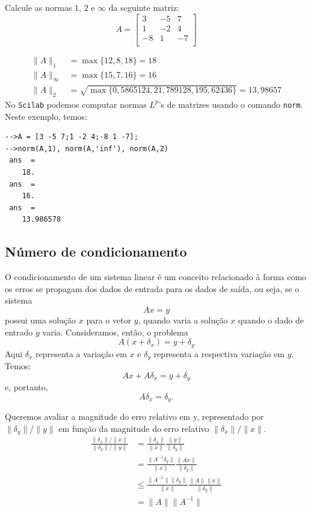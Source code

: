 \begin{ex}
Calcule as normas $1$, $2$ e $\infty$ da seguinte matriz:
\begin{equation*}
  A=\left[
\begin{array}{ccc}
3 & -5 & 7\\
1 & -2 & 4\\
-8 & 1 & -7\\
\end{array}
\right]
\end{equation*}
\end{ex}
\begin{sol}
  \begin{align*}
    \|A\|_1 &= \max\{12, 8, 18\}=18\\
    \|A\|_\infty &= \max\{15, 7, 16\}=16\\
    \|A\|_2 &= \sqrt{\max\{0,5865124, 21,789128, 195,62436\}}= 13,98657
  \end{align*}
\ifisscilab
No \verb+Scilab+ podemos computar normas $L^p$'s de matrizes usando o comando \verb+norm+. Neste exemplo, temos:
\begin{verbatim}
-->A = [3 -5 7;1 -2 4;-8 1 -7];
-->norm(A,1), norm(A,'inf'), norm(A,2)
 ans  =
    18.  
 ans  =
    16.  
 ans  =
    13.986578
\end{verbatim}
\fi
\end{sol}

\subsection{Número de condicionamento}

O condicionamento de um sistema linear é um conceito relacionado à forma como os erros se propagam dos dados de entrada para os dados de saída, ou seja, se o sistema $$Ax=y$$
possui uma solução $x$ para o vetor $y$, quando varia a solução $x$ quando o dado de entrado $y$ varia. Consideramos, então, o problema
$$A(x+\delta_x)=y+\delta_y$$
Aqui $\delta_x$ representa a variação em $x$ e $\delta_y$ representa a respectiva variação em $y$. Temos:
$$Ax+A\delta_x=y+\delta_y$$ e, portanto,
$$A\delta_x=\delta_y.$$

Queremos avaliar a magnitude do erro relativo em y, representado por $\|\delta_y\|/\|y\|$ em função da magnitude do erro relativo $\|\delta_x\|/\|x\|$.
\begin{align*}
\frac{\|\delta_x\|/\|x\|}{\|\delta_y\|/\|y\|} &= \frac{\|\delta_x\|}{\|x\|}\frac{\|y\|}{\|\delta_y\|}\\ 
&= \frac{\|A^{-1}\delta_y\|}{\|x\|}\frac{\|Ax\|}{\|\delta_y\|} \\
&\leq \frac{\|A^{-1}\|\|\delta_y\|}{\|x\|}\frac{\|A\|\|x\|}{\|\delta_y\|}\\
&=\|A\|\|A^{-1}\|  
\end{align*}

